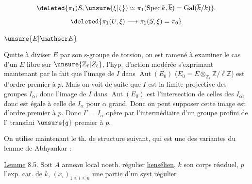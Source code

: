 \[
\deleted{\pi_1(S,\unsure{\xi|\zeta})\simeq\pi_1(\operatorname{Spec}k,\overline k)=\operatorname{Gal}(\overline k/k)}.
\]
\[
\deleted{\pi_1(U,\xi)\longrightarrow\pi_1(S,\xi)=\pi_0}
\]

 $\unsure{E|\mathscr E}$

Quitte à diviser $E$ par son s-groupe de torsion,  on est ramené à examiner le cas d'un $E$ libre sur $\unsure{\mathbb Z_\ell|Z_\ell}$, l'hyp. d'action modérée s'exprimant maintenant par le fait que l'image de $I$ dans $\operatorname{Aut}(E_0)$ ($E_0=E\otimes_{\mathbb Z_\ell}\mathbb Z/\ell\mathbb Z$) est d'ordre premier à $p$. Mais on voit de suite que $I$ est la limite projective des groupes $I_\alpha$, donc l'image de $I$ dans $\operatorname{Aut}(E_0)$ est  l'intersection de celles des $I_\alpha$, donc est égale à celle de $I_\alpha$ pour $\alpha$ grand. Donc on peut supposer   cette image est d'ordre premier à $p$. Donc $I'=I_\alpha$ opère  par l'intermédiaire d'un groupe profini  de l'  transfini $\unsure{q}$ premier à $p$.

 On utilise maintenant le th. de structure suivant, qui est une des variantes du lemme de Abhyankar :

\uline{Lemme} 8.5. Soit $A$ anneau local noeth. régulier \uline{hensélien}, $k$ son corps résiduel, $p$ l'exp. car. de $k$,  $(x_i)_{1\leq i\leq n}$ une partie d'un syst \uline{régulier}

